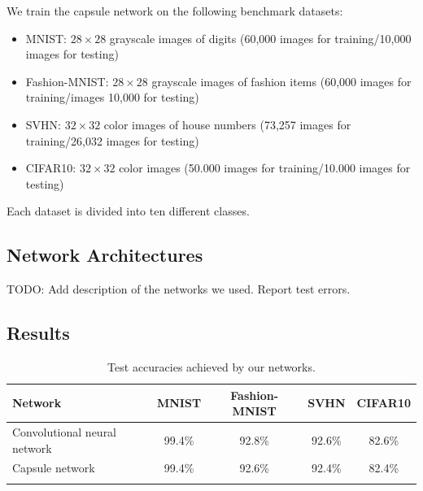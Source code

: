 \documentclass{article}
\begin{document}
We train the capsule network on the following benchmark datasets:
\begin{itemize}
	\item MNIST: $28\times28$ grayscale images of digits (60,000  images for training/10,000  images for testing) \cite{mnist}
	\item Fashion-MNIST:  $28\times28$ grayscale images of fashion items (60,000 images for training/images 10,000 for testing) \cite{fashion}
	\item SVHN: $32\times32$ color images of house numbers (73,257  images for training/26,032  images for testing) \cite{svhn}
	\item CIFAR10: $32\times32$ color images (50.000  images for training/10.000  images for testing) \cite{cifar}
\end{itemize}
Each dataset is divided into ten different classes.

\subsection{Network Architectures}
TODO: Add description of the networks we used. Report test errors.

\subsection{Results}
\begin{table}[h]
	\centering
	\begin{tabular}{lcccc}
		\toprule
		Network       & MNIST & Fashion-MNIST & SVHN & CIFAR10  \\
		\midrule
		Convolutional neural network & 99.4\% & 92.8\% & 92.6\% & 82.6\% \\
		Capsule network            & 99.4\% & 92.6\% & 92.4\% & 82.4\% \\
		\bottomrule\\
	\end{tabular}
	\label{tab:accuracies}
	\caption{Test accuracies achieved by our networks.}
\end{table}
\end{document}
